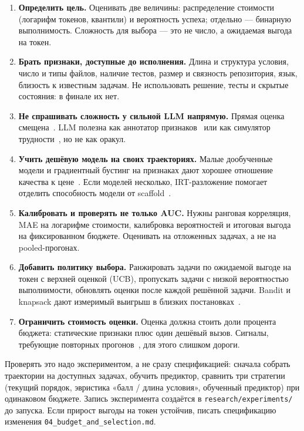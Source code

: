 \documentclass[11pt,a4paper]{article}
\begin{document}
\begin{enumerate}
  \item \textbf{Определить цель.} Оценивать две величины: распределение
        стоимости (логарифм токенов, квантили) и вероятность успеха; отдельно
        — бинарную выполнимость. Сложность для выбора — это не число, а
        ожидаемая выгода на токен.
  \item \textbf{Брать признаки, доступные до исполнения.} Длина и структура
        условия, число и типы файлов, наличие тестов, размер и связность
        репозитория, язык, близость к известным задачам. Не использовать
        решение, тесты и скрытые состояния: в финале их нет.
  \item \textbf{Не спрашивать сложность у сильной LLM напрямую.} Прямая
        оценка смещена~\cite{li2026struggles,li2025item}. LLM полезна как
        аннотатор признаков~\cite{peters2025textbased} или как симулятор
        трудности~\cite{acquaye2026calculators}, но не как оракул.
  \item \textbf{Учить дешёвую модель на своих траекториях.} Малые
        дообученные модели и градиентный бустинг на признаках дают хорошее
        отношение качества к цене~\cite{li2025item,stepanek2023item,harshith2025cost}.
        Если моделей несколько, IRT-разложение помогает отделить способность
        модели от scaffold~\cite{ge2026psychometrics}.
  \item \textbf{Калибровать и проверять не только AUC.} Нужны ранговая
        корреляция, MAE на логарифме стоимости, калибровка вероятностей и
        итоговая выгода на фиксированном бюджете. Оценивать на отложенных
        задачах, а не на pooled-прогонах.
  \item \textbf{Добавить политику выбора.} Ранжировать задачи по
        ожидаемой выгоде на токен с верхней оценкой (UCB), пропускать задачи
        с низкой вероятностью выполнимости, обновлять оценки после каждой
        решённой задачи. Bandit и knapsack дают измеримый выигрыш в близких
        постановках~\cite{panda2025adaptive,hamri2026zebra,zuo2025bandit}.
  \item \textbf{Ограничить стоимость оценки.} Оценка должна стоить доли
        процента бюджета: статические признаки плюс один дешёвый вызов.
        Сигналы, требующие повторных прогонов~\cite{mehta2026disagree},
        для этого слишком дороги.
\end{enumerate}

Проверять это надо экспериментом, а не сразу спецификацией: сначала собрать
траектории на доступных задачах, обучить предиктор, сравнить три стратегии
(текущий порядок, эвристика «балл / длина условия», обученный предиктор) при
одинаковом бюджете. Запись эксперимента создаётся в
\texttt{research/experiments/} до запуска. Если прирост выгоды на токен
устойчив, писать спецификацию изменения
\texttt{04\_budget\_and\_selection.md}.
\end{document}
